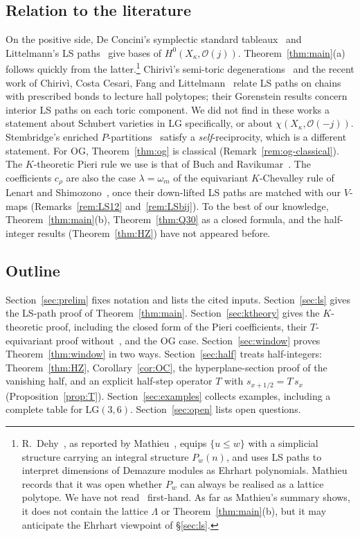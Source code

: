 \documentclass[11pt]{amsart}
\theoremstyle{definition}
\theoremstyle{remark}
\newcommand{\LG}{\mathrm{LG}}
\newcommand{\OG}{\mathrm{OG}}
\newcommand{\cO}{\mathcal{O}}
\begin{document}
\subsection{Relation to the literature}\label{ssec:lit}
On the positive side, De Concini's symplectic standard tableaux~\cite{DeC79} and Littelmann's
LS paths~\cite{Lit94} give bases of $H^0(X_\kappa,\cO(j))$. Theorem~\ref{thm:main}(a)
follows quickly from the latter.\footnote{R.~Dehy~\cite{Dehy98}, as reported by
Mathieu~\cite[\S4]{Mat95}, equips $\{u\le w\}$ with a simplicial structure carrying an
integral structure $P_w(n)$, and uses LS paths to interpret dimensions of Demazure modules as
Ehrhart polynomials. Mathieu records that it was open whether $P_w$ can always be realised as
a lattice polytope. We have not read~\cite{Dehy98} first-hand. As far as Mathieu's summary
shows, it does not contain the lattice $\Lambda$ or Theorem~\ref{thm:main}(b), but it may
anticipate the Ehrhart viewpoint of \S\ref{sec:ls}.}
Chirivì's semi-toric degenerations~\cite{Chi00} and the recent work of Chirivì, Costa Cesari,
Fang and Littelmann~\cite{CCFL} relate LS paths on chains with prescribed bonds to lecture hall
polytopes; their Gorenstein results concern interior LS paths on each toric component. We did
not find in these works a statement about Schubert varieties in $\LG$ specifically, or about
$\chi(X_\kappa,\cO(-j))$. Stembridge's enriched $P$-partitions~\cite{Stem97} satisfy a
\emph{self}-reciprocity, which is a different statement. For $\OG$, Theorem~\ref{thm:og} is
classical (Remark~\ref{rem:og-classical}). The $K$-theoretic Pieri rule we use is that of
Buch and Ravikumar~\cite{BR12}. The coefficients $c_\rho$ are also the case $\lambda=\omega_m$ of the
equivariant $K$-Chevalley rule of Lenart and Shimozono~\cite{LS12}, once their down-lifted LS paths are
matched with our $V$-maps (Remarks~\ref{rem:LS12} and~\ref{rem:LSbij}). To the best of our knowledge, Theorem~\ref{thm:main}(b),
Theorem~\ref{thm:Q30} as a closed formula, and the half-integer results
(Theorem~\ref{thm:HZ}) have not appeared before.

\subsection{Outline}
Section~\ref{sec:prelim} fixes notation and lists the cited inputs.
Section~\ref{sec:ls} gives the LS-path proof of Theorem~\ref{thm:main}.
Section~\ref{sec:ktheory} gives the $K$-theoretic proof, including the closed form of the
Pieri coefficients, their $T$-equivariant proof without~\cite{BR12}, and the $\OG$ case. Section~\ref{sec:window} proves
Theorem~\ref{thm:window} in two ways. Section~\ref{sec:half} treats half-integers:
Theorem~\ref{thm:HZ}, Corollary~\ref{cor:OC}, the hyperplane-section proof of the
vanishing half, and an explicit half-step operator $T$ with $s_{x+1/2}=T\,s_x$
(Proposition~\ref{prop:T}). Section~\ref{sec:examples} collects examples, including a complete table for
$\LG(3,6)$. Section~\ref{sec:open} lists open questions.
\end{document}
